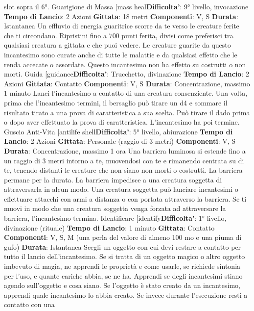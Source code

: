 \begin{multicols}{2}
slot sopra il 6°.
Guarigione di Massa
[mass heal\textbf{Difficolta'}:
9° livello, invocazione
\textbf{Tempo di Lancio}: 2 Azioni
\textbf{Gittata}: 18 metri
\textbf{Componenti}: V, S
\textbf{Durata}: Istantanea
Un effluvio di energia guaritrice scorre da te verso le
creature ferite che ti circondano. Ripristini fino a 700
punti ferita, divisi come preferisci tra qualsiasi creatura
a gittata e che puoi vedere. Le creature guarite da
questo incantesimo sono curate anche di tutte le
malattie e da qualsiasi effetto che le renda accecate o
assordate. Questo incantesimo non ha effetto su
costrutti o non morti.
Guida
[guidance\textbf{Difficolta'}:
Trucchetto, divinazione
\textbf{Tempo di Lancio}: 2 Azioni
\textbf{Gittata}: Contatto
\textbf{Componenti}: V, S
\textbf{Durata}: Concentrazione, massimo 1 minuto
Lanci l’incantesimo a contatto di una creatura
consenziente. Una volta, prima che l’incantesimo
termini, il bersaglio può tirare un d4 e sommare il
risultato tirato a una prova di caratteristica a sua scelta.
Può tirare il dado prima o dopo aver effettuato la prova
di caratteristica. L’incantesimo ha poi termine.
Guscio Anti-Vita
[antilife shell\textbf{Difficolta'}:
5° livello, abiurazione
\textbf{Tempo di Lancio}: 2 Azioni
\textbf{Gittata}: Personale (raggio di 3 metri)
\textbf{Componenti}: V, S
\textbf{Durata}: Concentrazione, massimo 1 ora
Una barriera luminosa si estende fino a un raggio di 3
metri intorno a te, muovendosi con te e rimanendo
centrata su di te, tenendo distanti le creature che non
siano non morti o costrutti. La barriera permane per la
durata.
La barriera impedisce a una creatura soggetta di
attraversarla in alcun modo. Una creatura soggetta può
lanciare incantesimi o effettuare attacchi con armi a
distanza o con portata attraverso la barriera.
Se ti muovi in modo che una creatura soggetta venga
forzata ad attraversare la barriera, l’incantesimo
termina.
Identificare
[identify\textbf{Difficolta'}:
1° livello, divinazione (rituale)
\textbf{Tempo di Lancio}: 1 minuto
\textbf{Gittata}: Contatto
\textbf{Componenti}: V, S, M (una perla del valore di almeno
100 mo e una piuma di gufo)
\textbf{Durata}: Istantanea
Scegli un oggetto con cui devi restare a contatto per
tutto il lancio dell’incantesimo. Se si tratta di un oggetto
magico o altro oggetto imbevuto di magia, ne apprendi
le proprietà e come usarle, se richiede sintonia per
l’uso, e quante cariche abbia, se ne ha. Apprendi se
degli incantesimi stiano agendo sull’oggetto e cosa
siano. Se l’oggetto è stato creato da un incantesimo,
apprendi quale incantesimo lo abbia creato.
Se invece durante l’esecuzione resti a contatto con una

\end{multicols}
